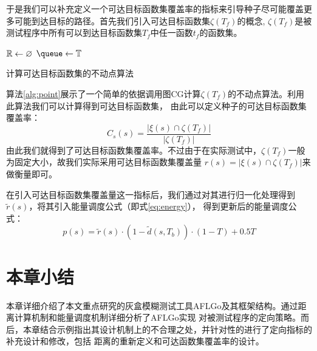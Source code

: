 \documentclass[bachelor]{njupthesis}
\begin{document}
于是我们可以补充定义一个可达目标函数集覆盖率的指标来引导种子尽可能覆盖更多可能到达目标的路径。首先我们引入可达目标函数集$\zeta(T_f)$的概念,
$\zeta(T_f)$是被测试程序中所有可以到达目标函数集$T_f$中任一函数$t_f$的函数集。

\begin{algorithm}[H]
	$\mathbb{R} \gets \varnothing$\;
	$\queue \gets \targets$ \; 
	\Return{\reach}\;
	\caption[short]{计算可达目标函数集的不动点算法}\label{alg:point} 
\end{algorithm} 
\vspace{6pt}
算法\ref{alg:point}展示了一个简单的依据调用图CG计算$\zeta(T_f)$的不动点算法。利用此算法我们可以计算得到可达目标函数集，
由此可以定义种子的可达目标函数集覆盖率：
\begin{equation}
	C_s(s)=\frac{|\xi(s) \cap \zeta(T_f)|}{|\zeta(T_f)|}
\end{equation}
由此我们就得到了可达目标函数集覆盖率。不过由于在实际测试中，$\zeta(T_f)$一般为固定大小，故我们实际采用可达目标函数集覆盖量
$r(s)=|\xi(s) \cap \zeta(T_f)|$来做衡量即可。

在引入可达目标函数集覆盖量这一指标后，我们通过对其进行归一化处理得到$\widetilde{r}(s)$，将其引入能量调度公式（即式\ref{eq:energy}），
得到更新后的能量调度公式：
\begin{equation}
	p(s)=\widetilde{r}(s) \cdot (1-\widetilde{d}(s,T_b))\cdot(1-T)+0.5T
\end{equation}

\section{本章小结}
本章详细介绍了本文重点研究的灰盒模糊测试工具AFLGo及其框架结构。通过距离计算机制和能量调度机制详细分析了AFLGo实现
对被测试程序的定向策略。而后，本章结合示例指出其设计机制上的不合理之处，并针对性的进行了定向指标的补充设计和修改，包括
距离的重新定义和可达函数集覆盖率的设计。
\end{document}

